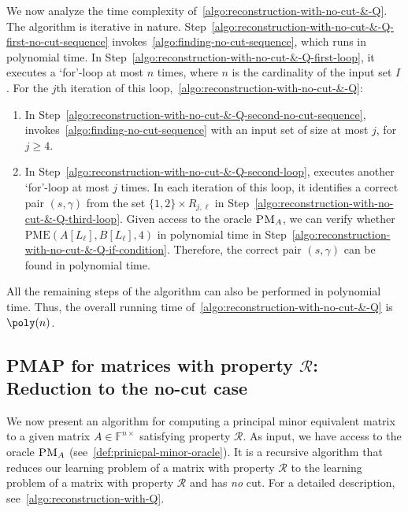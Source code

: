 \documentclass[11pt,letterpaper]{article}
\newcommand{\sgc}[1]{\textcolor{orange}{\guillemotleft \textbf{Sumanta:} #1\guillemotright}}
\newcommand{\F}{\mathbb{F}}
\newcommand{\kPME}[3]{\mathrm{PME}(#1, #2, #3)}
\newcommand{\prop}{\mathcal{R}}
\newcommand{\PMoracle}[1]{\textsc{PM}_{#1}}
\begin{document}
{{{We now analyze the time complexity of~\cref{algo:reconstruction-with-no-cut-&-Q}. The algorithm is iterative in nature. Step~\ref{algo:reconstruction-with-no-cut-&-Q-first-no-cut-sequence} invokes~\cref{algo:finding-no-cut-sequence}, which runs in polynomial time.  In Step~\ref{algo:reconstruction-with-no-cut-&-Q-first-loop}, it executes a `for'-loop at most $n$ times, where $n$ is the cardinality of the input set $I$. For the $j$th iteration of this loop,~\cref{algo:reconstruction-with-no-cut-&-Q}:
\begin{enumerate}
\item In Step~\ref{algo:reconstruction-with-no-cut-&-Q-second-no-cut-sequence}, invokes~\cref{algo:finding-no-cut-sequence} with an input set of size at most $j$, for $j\geq 4$.
\item In Step~\ref{algo:reconstruction-with-no-cut-&-Q-second-loop}, executes another `for'-loop  at most $j$ times. In each iteration of this loop, it identifies a correct pair $(s, \gamma)$ from the set $\{1,2\}\times R_{j,\ell}$ in Step~\ref{algo:reconstruction-with-no-cut-&-Q-third-loop}. Given access to the oracle $\PMoracle{A}$, we can verify whether $\kPME{A[L_\ell]}{B[L_\ell]}{4}$ in polynomial time in Step~\ref{algo:reconstruction-with-no-cut-&-Q-if-condition}. Therefore, the correct pair $(s, \gamma)$ can be found in polynomial time.
\end{enumerate}
All the remaining steps of the algorithm can also be performed in polynomial time. Thus, the overall running time of~\cref{algo:reconstruction-with-no-cut-&-Q} is $\poly(n)$.



\subsection{PMAP for matrices with property $\prop$: Reduction to the no-cut case}
\label{subsec:reconstruction-with-Q}

We now present an algorithm for computing a principal minor equivalent matrix to a given  matrix $A\in\F^{n\times }$ satisfying property $\prop$. As input, we have access to the oracle $\PMoracle{A}$ (see~\cref{def:prinicpal-minor-oracle}). It is a recursive algorithm that reduces our learning problem of a matrix with property $\prop$ to the learning problem of a matrix with property $\prop$ and has \emph{no} cut. For a detailed description, see~\cref{algo:reconstruction-with-Q}. 


}}}
\end{document}
